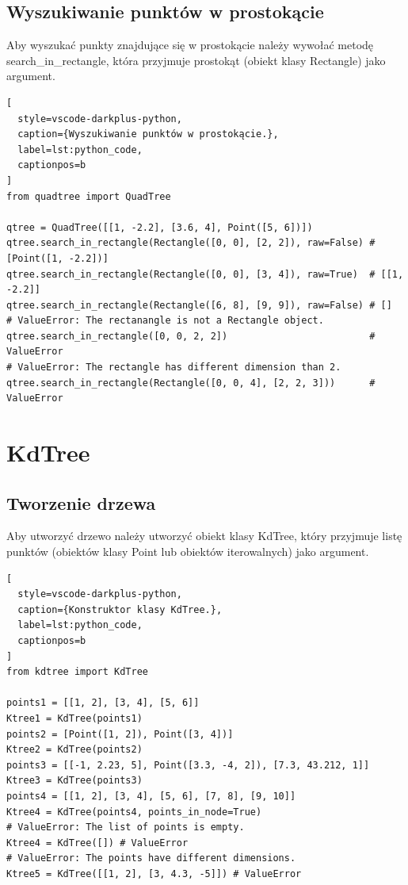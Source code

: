 \documentclass{lab}
\begin{document}
\subsection{Wyszukiwanie punktów w prostokącie}
Aby wyszukać punkty znajdujące się w prostokącie należy wywołać metodę search\_in\_rectangle, która przyjmuje prostokąt (obiekt klasy Rectangle) jako argument.
\begin{lstlisting}[
  style=vscode-darkplus-python,
  caption={Wyszukiwanie punktów w prostokącie.},
  label=lst:python_code,
  captionpos=b
]
from quadtree import QuadTree

qtree = QuadTree([[1, -2.2], [3.6, 4], Point([5, 6])])
qtree.search_in_rectangle(Rectangle([0, 0], [2, 2]), raw=False) # [Point([1, -2.2])]
qtree.search_in_rectangle(Rectangle([0, 0], [3, 4]), raw=True)  # [[1, -2.2]]
qtree.search_in_rectangle(Rectangle([6, 8], [9, 9]), raw=False) # []
# ValueError: The rectanangle is not a Rectangle object.
qtree.search_in_rectangle([0, 0, 2, 2])                         # ValueError
# ValueError: The rectangle has different dimension than 2.
qtree.search_in_rectangle(Rectangle([0, 0, 4], [2, 2, 3]))      # ValueError
\end{lstlisting}

\section{KdTree}
\subsection{Tworzenie drzewa}
Aby utworzyć drzewo należy utworzyć obiekt klasy KdTree, który przyjmuje listę punktów (obiektów klasy Point lub obiektów iterowalnych) jako argument.
\begin{lstlisting}[
  style=vscode-darkplus-python,
  caption={Konstruktor klasy KdTree.},
  label=lst:python_code,
  captionpos=b
]
from kdtree import KdTree

points1 = [[1, 2], [3, 4], [5, 6]]
Ktree1 = KdTree(points1)
points2 = [Point([1, 2]), Point([3, 4])]
Ktree2 = KdTree(points2)
points3 = [[-1, 2.23, 5], Point([3.3, -4, 2]), [7.3, 43.212, 1]]
Ktree3 = KdTree(points3)
points4 = [[1, 2], [3, 4], [5, 6], [7, 8], [9, 10]]
Ktree4 = KdTree(points4, points_in_node=True)
# ValueError: The list of points is empty.
Ktree4 = KdTree([]) # ValueError
# ValueError: The points have different dimensions.
Ktree5 = KdTree([[1, 2], [3, 4.3, -5]]) # ValueError
\end{lstlisting}
\end{document}
